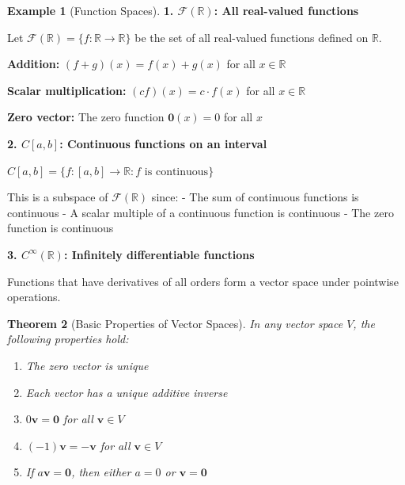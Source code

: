 \documentclass[12pt]{article}
\numberwithin{equation}{section}
\newcommand{\vect}[1]{\boldsymbol{#1}}   %
\theoremstyle{plain}
\newtheorem{theorem}{Theorem}[section]
\theoremstyle{definition}
\newtheorem{example}[theorem]{Example}
\theoremstyle{remark}
\begin{document}
\begin{example}[Function Spaces]
\textbf{1. $\mathcal{F}(\mathbb{R})$: All real-valued functions}

Let $\mathcal{F}(\mathbb{R}) = \{f : \mathbb{R} \to \mathbb{R}\}$ be the set of all real-valued functions defined on $\mathbb{R}$.

\textbf{Addition:} $(f + g)(x) = f(x) + g(x)$ for all $x \in \mathbb{R}$

\textbf{Scalar multiplication:} $(cf)(x) = c \cdot f(x)$ for all $x \in \mathbb{R}$

\textbf{Zero vector:} The zero function $\mathbf{0}(x) = 0$ for all $x$

\textbf{2. $C[a,b]$: Continuous functions on an interval}

$C[a,b] = \{f : [a,b] \to \mathbb{R} : f \text{ is continuous}\}$

This is a subspace of $\mathcal{F}(\mathbb{R})$ since:
- The sum of continuous functions is continuous
- A scalar multiple of a continuous function is continuous
- The zero function is continuous

\textbf{3. $C^\infty(\mathbb{R})$: Infinitely differentiable functions}

Functions that have derivatives of all orders form a vector space under pointwise operations.
\end{example}

\begin{theorem}[Basic Properties of Vector Spaces]
In any vector space $V$, the following properties hold:
\begin{enumerate}
\item The zero vector is unique
\item Each vector has a unique additive inverse
\item $0\vect{v} = \vect{0}$ for all $\vect{v} \in V$
\item $(-1)\vect{v} = -\vect{v}$ for all $\vect{v} \in V$
\item If $a\vect{v} = \vect{0}$, then either $a = 0$ or $\vect{v} = \vect{0}$
\end{enumerate}
\end{theorem}
\end{document}
